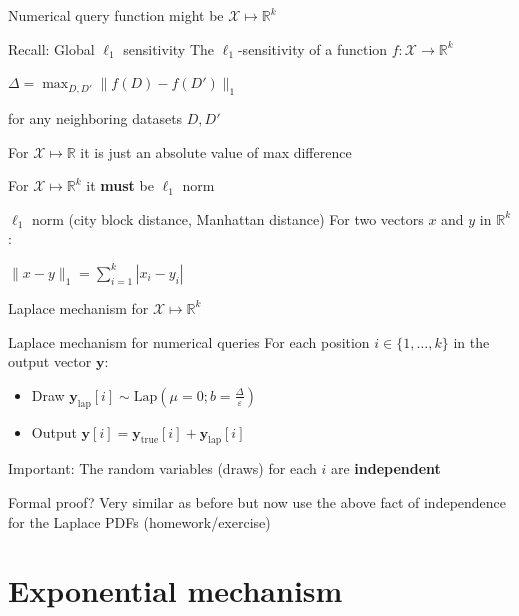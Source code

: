 \documentclass[12pt,aspectratio=169,handout]{beamer}
\begin{document}
\begin{frame}{Numerical query function might be $\mathcal{X} \mapsto \mathbb{R}^k$}

\begin{block}{Recall: Global $\ell_1$ sensitivity}
The $\ell_1$-sensitivity of a function $f : \mathcal{X} \rightarrow \mathbb{R}^k$

$\Delta = \max_{D, D'} \| f(D) - f(D') \|_1$

for any neighboring datasets $D, D'$
\end{block}

For $\mathcal{X} \mapsto \mathbb{R}$ it is just an absolute value of max difference

For $\mathcal{X} \mapsto \mathbb{R}^k$ it \textbf{must} be $\ell_1$ norm

\begin{block}{$\ell_1$ norm (city block distance, Manhattan distance)}
For two vectors $x$ and $y$ in $\mathbb{R}^k$:

$\| x - y\|_1 = \sum_{i = 1}^{k} | x_i - y_i |$
\end{block}

\end{frame}

\begin{frame}{Laplace mechanism for $\mathcal{X} \mapsto \mathbb{R}^k$}

\begin{block}{Laplace mechanism for numerical queries}
For each position $i \in \{1, \dots, k\}$ in the output vector $\mathbf{y}$:
\begin{itemize}
\item Draw $\mathbf{y}_{\mathrm{lap}}[i] \sim \textrm{Lap}(\mu = 0; b=\frac{\Delta}{\varepsilon})$
\item Output $\mathbf{y}[i] = \mathbf{y}_{\mathrm{true}}[i] + \mathbf{y}_{\mathrm{lap}}[i]$
\end{itemize}
\end{block}

Important: The random variables (draws) for each $i$ are \textbf{independent}

Formal proof? Very similar as before but now use the above fact of independence for the Laplace PDFs (homework/exercise)

\end{frame}

\section{Exponential mechanism}
\end{document}
